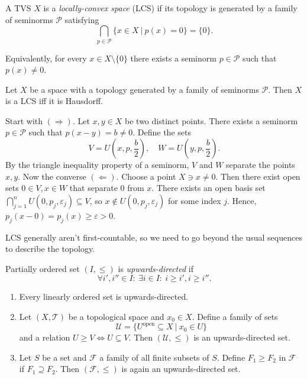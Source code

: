 \begin{definition}
    A TVS $X$ is a \emph{locally-convex space} (LCS) if its topology is generated by 
    a family of seminorms $\mathcal{P}$ satisfying 
    $$\bigcap_{p \in \mathcal{P}} \{x \in X\ |\ p(x) = 0\} = \{0\}.$$
\end{definition}

Equivalently, for every $x \in X \setminus \{0\}$ there exists a seminorm $p \in \mathcal{P}$ such that $p(x) \neq 0$.

\begin{corollary}
  Let $X$ be a space with a topology generated by a family of seminorms $\mathcal{P}$. Then $X$ is a LCS iff it is Hausdorff.
\end{corollary}

\begin{myproof}
    Start with $(\Rightarrow)$. Let $x, y \in X$ be two distinct points. There exists a seminorm $p \in \mathcal{P}$
    such that $p(x - y) = b \neq 0$. Define the sets 
    $$V = U\left(x, p, \frac{b}{2}\right),\quad W = U\left(y, p, \frac{b}{2}\right).$$
    By the triangle inequality property of a seminorm, $V$ and $W$ separate the points $x, y$.
    Now the converse $(\Leftarrow)$. Choose a point $X \ni x \neq 0$. Then there exist open sets $0 \in V, x \in W$
    that separate $0$ from $x$. There exists an open basis set $\bigcap_{j = 1} ^n U(0, p_j, \varepsilon_j) \subseteq V$,
    so $x \notin U(0, p_j, \varepsilon_j)$ for some index $j$. Hence, $p_j (x - 0) = p_j(x) \geq \varepsilon > 0$.
\end{myproof}

LCS generally aren't first-countable, so we need to go beyond the usual sequences to describe the topology.

\begin{definition}
    Partially ordered set $(I, \leq)$ is \emph{upwards-directed} if 
    $$\forall i', i'' \in I:\ \exists i \in I:\ i \geq i', i \geq i''.$$
\end{definition}

\begin{example}\label{ex:1.1}
    \begin{enumerate}
        \item Every linearly ordered set is upwards-directed.
        \item Let $(X, \mathcal{T})$ be a topological space and $x_0 \in X$.
        Define a family of sets 
        $$\mathcal{U} = \{U^{\textrm{open}} \subseteq X\ |\ x_0 \in U\}$$
        and a relation $U \geq V \Leftrightarrow U \subseteq V$. Then $(\mathcal{U}, \leq)$ is an upwards-directed set.
        \item Let $S$ be a set and $\mathcal{F}$ a family of all finite subsets of $S$. Define $F_1 \geq F_2$ in $\mathcal{F}$
        if $F_1 \supseteq F_2$. Then $(\mathcal{F}, \leq)$ is again an upwards-directed set.
    \end{enumerate}
\end{example}

